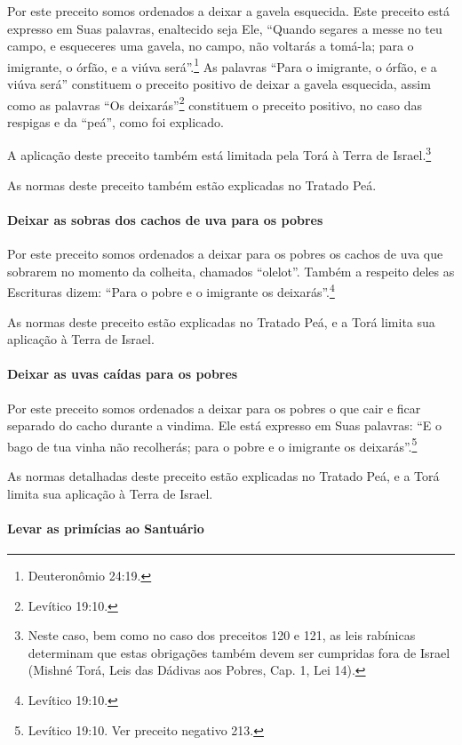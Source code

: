 Por este preceito somos ordenados a deixar a gavela esquecida. Este
preceito está expresso em Suas palavras, enaltecido seja Ele, ``Quando
segares a messe no teu campo, e esqueceres uma gavela, no campo, não
voltarás a tomá-la; para o imigrante, o órfão, e a viúva será''.\footnote{Deuteronômio 24:19.} As palavras ``Para o imigrante, o órfão, e a viúva
será'' constituem o preceito positivo de
deixar a gavela esquecida, assim como as palavras ``Os deixarás''\footnote{Levítico 19:10.} constituem o preceito positivo, no caso das respigas e da ``peá'', como
foi explicado.

A aplicação deste preceito também está limitada pela Torá à Terra de Israel.\footnote{Neste caso, bem como no caso dos preceitos 120 e 121, as leis
  rabínicas determinam que estas obrigações também devem ser cumpridas
  fora de Israel (Mishné Torá, Leis das Dádivas aos Pobres, Cap. 1,
  Lei 14).}

As normas deste preceito também estão explicadas no Tratado Peá.

\paragraph{Deixar as sobras dos cachos de uva para os pobres}

Por este preceito somos ordenados a deixar para os pobres os cachos de
uva que sobrarem no momento da colheita, chamados ``olelot''. Também a
respeito deles as Escrituras dizem: ``Para o pobre e o imigrante os
deixarás''.\footnote{Levítico 19:10.}

As normas deste preceito estão explicadas no Tratado Peá, e a Torá
limita sua aplicação à Terra de Israel.

\paragraph{Deixar as uvas caídas para os pobres}

Por este preceito somos ordenados a deixar para os pobres o que cair e
ficar separado do cacho durante a vindima. Ele está expresso em Suas
palavras: ``E o bago de tua vinha não recolherás; para o pobre e o
imigrante os deixarás''.\footnote{Levítico 19:10. Ver preceito negativo 213.}

As normas detalhadas deste preceito estão explicadas no Tratado Peá, e a
Torá limita sua aplicação à Terra de Israel.

\paragraph{Levar as primícias ao Santuário}

